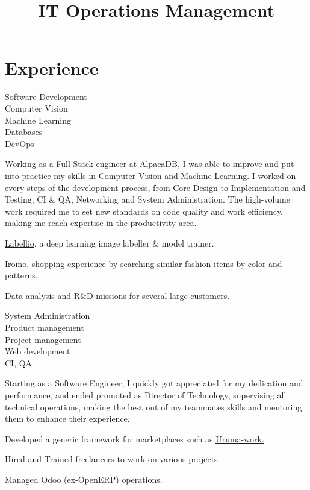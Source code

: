 \documentclass[a4paper,11pt]{cv4tw}%
\title{\\ IT Operations Management}
\begin{document}
\section{Experience}
{Software Development\\Computer Vision\\ Machine Learning\\Databases\\DevOps}
    { Working as a Full Stack engineer at AlpacaDB, I was able to improve and put
      into practice my skills in Computer Vision and Machine Learning. I
      worked on every steps of the development process, from Core Design to
      Implementation and Testing, CI \& QA, Networking and System Administration.
      The high-volume work required me to set new standards on code quality and work
      efficiency, making me reach expertise in the productivity area.
	\begin{missions}
        \item \underline{\href{http://www.labell.io/}{Labellio}}, a deep
            learning image labeller \& model trainer.
        \item \underline{\href{http://iromo.jp}{Iromo}}, shopping experience by
            searching similar fashion items by color and patterns.
        \item Data-analysis and R\&D missions for several large customers.
	\end{missions}
}
{System Administration\\Product management\\Project management\\Web
development\\CI, QA}
	{ Starting as a Software Engineer, I quickly got appreciated for my
      dedication and performance, and ended promoted as Director of
      Technology, supervising all technical operations, making the best out of
      my teammates skills and mentoring them to enhance their experience.
	\begin{missions}
        \item Developed a generic framework for marketplaces such as
            \underline{\href{https://uruma-work.com}{Uruma-work}.}
        \item Hired and Trained freelancers to work on various projects.
        \item Managed Odoo (ex-OpenERP) operations.
	\end{missions}
}
\end{document}
